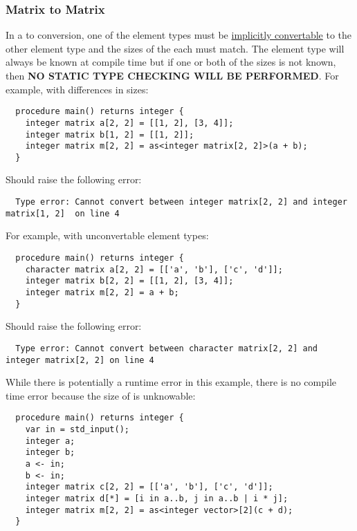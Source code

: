 \documentclass[../gazprea.tex]{subfiles}
\begin{document}
\subsubsection{Matrix to Matrix}
\label{sssec:error_ops_mtom}
In a  to  conversion, one of the element types must be
\hyperref[typePromotion]{implicitly convertable} to the other element type and the sizes of the
each  must match. The element type will always be known at compile time but if one or
both of the sizes is not known, then \textbf{NO STATIC TYPE CHECKING WILL BE PERFORMED}. For
example, with differences in sizes:
\begin{lstlisting}
  procedure main() returns integer {
    integer matrix a[2, 2] = [[1, 2], [3, 4]];
    integer matrix b[1, 2] = [[1, 2]];
    integer matrix m[2, 2] = as<integer matrix[2, 2]>(a + b);
  }
\end{lstlisting}

Should raise the following error:
\begin{lstlisting}
  Type error: Cannot convert between integer matrix[2, 2] and integer matrix[1, 2]  on line 4
\end{lstlisting}

For example, with unconvertable element types:
\begin{lstlisting}
  procedure main() returns integer {
    character matrix a[2, 2] = [['a', 'b'], ['c', 'd']];
    integer matrix b[2, 2] = [[1, 2], [3, 4]];
    integer matrix m[2, 2] = a + b;
  }
\end{lstlisting}

Should raise the following error:
\begin{lstlisting}
  Type error: Cannot convert between character matrix[2, 2] and integer matrix[2, 2] on line 4
\end{lstlisting}

While there is potentially a runtime error in this example, there is no compile time error because
the size of  is unknowable:
\begin{lstlisting}
  procedure main() returns integer {
    var in = std_input();
    integer a;
    integer b;
    a <- in;
    b <- in;
    integer matrix c[2, 2] = [['a', 'b'], ['c', 'd']];
    integer matrix d[*] = [i in a..b, j in a..b | i * j];
    integer matrix m[2, 2] = as<integer vector>[2](c + d);
  }
\end{lstlisting}
\end{document}
